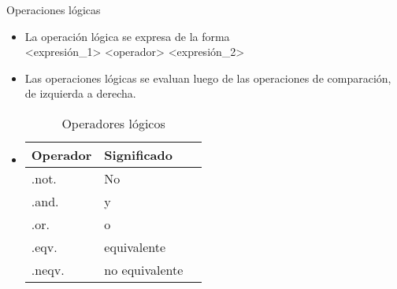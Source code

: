 \begin{frame}[fragile]{Operaciones lógicas}  
 \begin{itemize}[<+(0)->]
  \item La operación lógica se expresa de la forma \\
      \centering <expresión\_1> <operador> <expresión\_2>
  \item Las operaciones lógicas se evaluan luego de las operaciones de comparación, de izquierda a derecha.
     \vspace{0.4cm}
  \item []
    \begin{table}[]
    \centering
    \label{Tabla_logica}
    \begin{tabular}{|l|l|l|}
    \hline
    Operador    & Significado     \\ \hline
    .not.       & No              \\ \hline
    .and.       & y               \\ \hline
    .or.        & o               \\ \hline
    .eqv.       & equivalente     \\ \hline
    .neqv.      & no equivalente  \\ \hline              
    \end{tabular}
    \caption*{Operadores lógicos}
    \end{table}
 \end{itemize}
\end{frame}